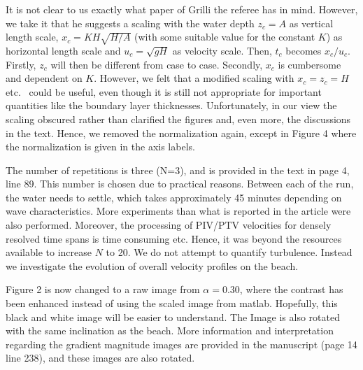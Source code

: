 \documentclass[11pt]{article}
\begin{document}
It is not clear to us exactly what paper of Grilli the referee has in mind. However, we take it that he suggests a scaling
with the water depth $z_c = A$ as vertical length scale, $x_c=KH\sqrt{H/A}$ (with some suitable value for the constant $K$)
as horizontal length scale and $u_c=\sqrt{gH}$ as velocity scale. Then, $t_c$ becomes $x_c/u_c$. Firstly, $z_c$ will then be different from 
case to case. Secondly, $x_c$ is cumbersome and dependent on $K$. However, we felt that a modified scaling with $x_c=z_c=H$ etc.~
could be useful, even though it is still not appropriate for important quantities like the boundary layer thicknesses. Unfortunately, in our view the scaling obscured rather than clarified the figures and, even more, the discussions in the text. Hence, we removed the normalization again, except in Figure 4 where the normalization is given in the axis labels.

The number of repetitions is three (N=3), and is provided in the text in page 4, line 89. This number is chosen due to practical reasons. Between each of the run, the water needs to settle, which takes approximately 45 minutes depending on wave characteristics. More experiments than what is reported in the article were also performed. Moreover, the processing of PIV/PTV velocities for densely resolved time spans is time consuming etc. Hence, it was beyond the resources available to increase $N$ to 20.  
We do not attempt to quantify turbulence. Instead we investigate the evolution of overall velocity profiles on the beach.

Figure 2 is now changed to a raw image from $\alpha=0.30$, where the contrast has been enhanced instead of using the scaled image from matlab. Hopefully, this black and white image will be easier to understand. The Image is also rotated with the same inclination as the beach. More information and interpretation regarding the gradient magnitude images are provided in the manuscript (page 14 line 238), and these images are also rotated.
\end{document}
